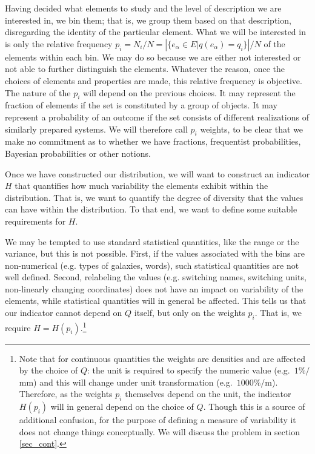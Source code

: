 \documentclass{article}
\begin{document}
Having decided what elements to study and the level of description we are interested in, we bin them; that is, we group them based on that description, disregarding the identity of the particular element. What we will be interested in is only the relative frequency $p_i = N_i / N = \left| \{e_\alpha \in E | q(e_\alpha) = q_i \} \right| / N$ of the elements within each bin. We may do so because we are either not interested or not able to further distinguish the elements. Whatever the reason, once the choices of elements and properties are made, this relative frequency is objective. The nature of the $p_i$ will depend on the previous choices. It may represent the fraction of elements if the set is constituted by a group of objects. It may represent a probability of an outcome if the set consists of different realizations of similarly prepared systems. We will therefore call $p_i$ weights, to be clear that we make no commitment as to whether we have fractions, frequentist probabilities, Bayesian probabilities or other notions.

Once we have constructed our distribution, we will want to construct an indicator $H$ that quantifies how much variability the elements exhibit within the distribution. That is, we want to quantify the degree of diversity that the values can have within the distribution. To that end, we want to define some suitable requirements for $H$.

We may be tempted to use standard statistical quantities, like the range or the variance, but this is not possible. First, if the values associated with the bins are non-numerical (e.g. types of galaxies, words), such statistical quantities are not well defined. Second, relabeling the values (e.g. switching names, switching units, non-linearly changing coordinates) does not have an impact on variability of the elements, while statistical quantities will in general be affected. This tells us that our indicator cannot depend on $Q$ itself, but only on the weights $p_i$. That is, we require $H=H(p_i)$.\footnote{Note that for continuous quantities the weights are densities and are affected by the choice of $Q$: the unit is required to specify the numeric value (e.g.~$1 \% / $mm) and this will change under unit transformation (e.g.~$1000 \% /$m). Therefore, as the weights $p_i$ themselves depend on the unit, the indicator $H(p_i)$ will in general depend on the choice of $Q$. Though this is a source of additional confusion, for the purpose of defining a measure of variability it does not change things conceptually. We will discuss the problem in section \ref{sec_cont}.}
\end{document}
